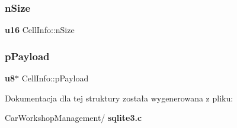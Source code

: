 \subsubsection{nSize}
{\footnotesize\ttfamily \textbf{ u16} Cell\+Info\+::n\+Size}

\mbox{\label{struct_cell_info_abbcd805bfcc10bed2ff5b81aae466940}} 
\subsubsection{pPayload}
{\footnotesize\ttfamily \textbf{ u8}$\ast$ Cell\+Info\+::p\+Payload}



Dokumentacja dla tej struktury została wygenerowana z pliku\+:\begin{DoxyCompactItemize}
\item 
Car\+Workshop\+Management/\textbf{ sqlite3.\+c}\end{DoxyCompactItemize}
